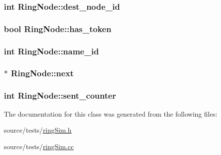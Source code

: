 \hypertarget{classRingNode_bc0c49f826af231d60c340df13223e1f}{
\subsubsection[{dest\_\-node\_\-id}]{\setlength{\rightskip}{0pt plus 5cm}int {\bf RingNode::dest\_\-node\_\-id}}}
\label{classRingNode_bc0c49f826af231d60c340df13223e1f}


\hypertarget{classRingNode_95e416d08952e356d6b2aa127b0b755b}{
\subsubsection[{has\_\-token}]{\setlength{\rightskip}{0pt plus 5cm}bool {\bf RingNode::has\_\-token}}}
\label{classRingNode_95e416d08952e356d6b2aa127b0b755b}


\hypertarget{classRingNode_684faa99d894fa7f2ffd3a877b98f75d}{
\subsubsection[{name\_\-id}]{\setlength{\rightskip}{0pt plus 5cm}int {\bf RingNode::name\_\-id}}}
\label{classRingNode_684faa99d894fa7f2ffd3a877b98f75d}


\hypertarget{classRingNode_96bfff0fd9bfdc0ffc30336b2deeb268}{
\subsubsection[{next}]{$\ast$ {\bf RingNode::next}}}
\label{classRingNode_96bfff0fd9bfdc0ffc30336b2deeb268}


\hypertarget{classRingNode_b9fb6f8509e1a43f315be89abda03a0c}{
\subsubsection[{sent\_\-counter}]{\setlength{\rightskip}{0pt plus 5cm}int {\bf RingNode::sent\_\-counter}}}
\label{classRingNode_b9fb6f8509e1a43f315be89abda03a0c}




The documentation for this class was generated from the following files:\begin{CompactItemize}
\item 
source/tests/\hyperlink{ringSim_8h}{ringSim.h}\item 
source/tests/\hyperlink{ringSim_8cc}{ringSim.cc}\end{CompactItemize}
